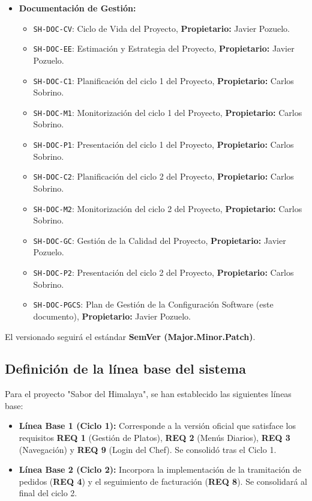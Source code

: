 \documentclass[11pt,a4paper]{article}
\begin{document}
\begin{itemize}
    \item \textbf{Documentación de Gestión:}
        \begin{itemize}
            \item \texttt{SH-DOC-CV}: Ciclo de Vida del Proyecto, \textbf{Propietario:} Javier Pozuelo.
            \item \texttt{SH-DOC-EE}: Estimación y Estrategia del Proyecto, \textbf{Propietario:} Javier Pozuelo.
            \item \texttt{SH-DOC-C1}: Planificación del ciclo 1 del Proyecto, \textbf{Propietario:} Carlos Sobrino.
            \item \texttt{SH-DOC-M1}: Monitorización del ciclo 1 del Proyecto, \textbf{Propietario:} Carlos Sobrino.
            \item \texttt{SH-DOC-P1}: Presentación del ciclo 1 del Proyecto, \textbf{Propietario:} Carlos Sobrino.
            \item \texttt{SH-DOC-C2}: Planificación del ciclo 2 del Proyecto, \textbf{Propietario:} Carlos Sobrino.
            \item \texttt{SH-DOC-M2}: Monitorización del ciclo 2 del Proyecto, \textbf{Propietario:} Carlos Sobrino.
            \item \texttt{SH-DOC-GC}: Gestión de la Calidad del Proyecto, \textbf{Propietario:} Javier Pozuelo.
            \item \texttt{SH-DOC-P2}: Presentación del ciclo 2 del Proyecto, \textbf{Propietario:} Carlos Sobrino.
            \item \texttt{SH-DOC-PGCS}: Plan de Gestión de la Configuración Software (este documento), \textbf{Propietario:} Javier Pozuelo.
        \end{itemize}
\end{itemize}

El versionado seguirá el estándar \textbf{SemVer (Major.Minor.Patch)}.

\subsection{Definición de la línea base del sistema}

Para el proyecto "Sabor del Himalaya", se han establecido las siguientes líneas base:

\begin{itemize}
    \item \textbf{Línea Base 1 (Ciclo 1):} Corresponde a la versión oficial que satisface los requisitos \textbf{REQ 1} (Gestión de Platos), \textbf{REQ 2} (Menús Diarios), \textbf{REQ 3} (Navegación) y \textbf{REQ 9} (Login del Chef). Se consolidó tras el Ciclo 1.

    \item \textbf{Línea Base 2 (Ciclo 2):} Incorpora la implementación de la tramitación de pedidos (\textbf{REQ 4}) y el seguimiento de facturación (\textbf{REQ 8}). Se consolidará al final del ciclo 2.
\end{itemize}
\end{document}
